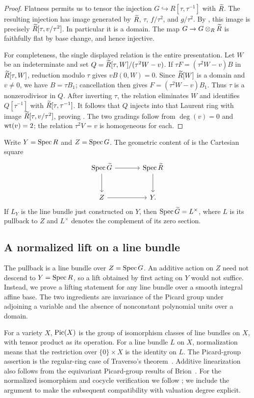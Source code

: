 \begin{proof}
Flatness permits us to tensor the injection
$G\hookrightarrow R[\tau,\tau^{-1}]$ with $\widetilde R$.
The resulting injection has image generated by
$\widetilde R$, $\tau$, $f/\tau^2$, and $g/\tau^2$.
By , this image is precisely
$\widetilde R[\tau,v/\tau^2]$. In particular it is a domain. The map
$G\to G\otimes_R\widetilde R$ is faithfully flat by base change, and hence
injective.

For completeness, the single displayed relation is the entire
presentation. Let $W$ be an indeterminate and set
$Q=\widetilde R[\tau,W]/(\tau^2W-v)$.
If $\tau F=(\tau^2W-v)B$ in $\widetilde R[\tau,W]$, reduction modulo
$\tau$ gives $vB(0,W)=0$. Since $\widetilde R[W]$ is a domain and $v\ne0$,
we have $B=\tau B_1$; cancellation then gives
$F=(\tau^2W-v)B_1$. Thus $\tau$ is a nonzerodivisor in $Q$.
After inverting $\tau$, the relation eliminates $W$ and identifies
$Q[\tau^{-1}]$ with $\widetilde R[\tau,\tau^{-1}]$.
It follows that $Q$ injects into that Laurent ring with image
$\widetilde R[\tau,v/\tau^2]$, proving .
The two gradings follow from $\deg(v)=0$ and $\operatorname{wt}(v)=2$;
the relation $\tau^2V=v$ is homogeneous for each.
\end{proof}

Write $Y=\operatorname{Spec} R$ and $Z=\operatorname{Spec} G$. The geometric content of
 is the Cartesian square
\[
\begin{tikzcd}[column sep=large,row sep=large]
 \Spec\Gt \arrow[r] \arrow[d] & \Spec\Rt \arrow[d] \\
 Z \arrow[r] & Y.
\end{tikzcd}
\]
If $L_Y$ is the line bundle just constructed on $Y$, then
$\operatorname{Spec}\widetilde G=L^\times$, where $L$ is its pullback to $Z$ and
$L^\times$ denotes the complement of its zero section.

\subsection{A normalized lift on a line bundle}

The pullback is a line bundle over $Z=\operatorname{Spec} G$. An additive action on
$Z$ need not descend to $Y=\operatorname{Spec} R$, so a lift obtained by first acting
on $Y$ would not suffice. Instead, we prove a lifting statement for any
line bundle over a smooth integral affine base. The two ingredients
are invariance of the Picard group under adjoining a variable and the
absence of nonconstant polynomial units over a domain.

For a variety $X$, $\operatorname{Pic}(X)$ is the group of isomorphism classes of line
bundles on $X$, with tensor product as its operation. For a line bundle
$L$ on $X$, normalization means that the restriction over
$\{0\}\times X$ is the identity on $L$.
The Picard-group assertion is the regular-ring case of
Traverso's theorem~\cite[Theorem~3.6]{Traverso}. Additive
linearization also follows from the equivariant Picard-group results
of Brion~\cite[Proposition~2.10 and Theorem~2.14]{Brion}. For the normalized
isomorphism and cocycle verification we follow
\cite[Lemma~2.9]{Brion}; we include the argument to make the subsequent
compatibility with valuation degree explicit.

